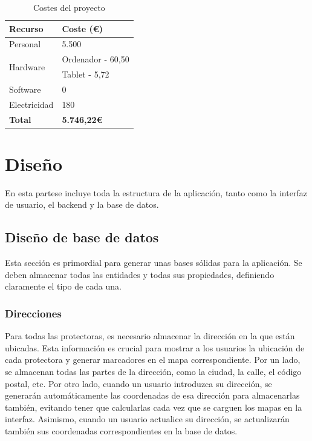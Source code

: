 \documentclass[a4paper, 12pt]{article}
\begin{document}
\begin{table}[H]
    \centering
    \begin{tabular}{ | m{5cm} | m{5cm} | }
	    \hline \textbf{Recurso} & \textbf{Coste (€)} \\ \hline
	    	Personal & 5.500 \\ \hline
	    	\multirow{2}{*}{Hardware} & Ordenador - 60,50 \\& Tablet - 5,72 \\ \hline
	    	Software & 0 \\ \hline
		Electricidad & 180 \\ \hline
	    \textbf{Total} & \textbf{5.746,22€} \\ \hline
    \end{tabular}
    \caption{Costes del proyecto}
    \label{tab:costes}
\end{table}

\newpage
\section{Diseño}

En esta partese incluye toda la estructura de la aplicación, tanto como la interfaz de usuario, el backend y la base de datos.

\subsection{Diseño de base de datos}

Esta sección es primordial para generar unas bases sólidas para la aplicación. Se deben almacenar todas las entidades y todas sus propiedades, definiendo claramente el tipo de cada una.

\subsubsection{Direcciones}

Para todas las protectoras, es necesario almacenar la dirección en la que están ubicadas. Esta información es crucial para mostrar a los usuarios la ubicación de cada protectora y generar marcadores en el mapa correspondiente. Por un lado, se almacenan todas las partes de la dirección, como la ciudad, la calle, el código postal, etc. Por otro lado, cuando un usuario introduzca su dirección, se generarán automáticamente las coordenadas de esa dirección para almacenarlas también, evitando tener que calcularlas cada vez que se carguen los mapas en la interfaz. Asimismo, cuando un usuario actualice su dirección, se actualizarán también sus coordenadas correspondientes en la base de datos.
\end{document}
